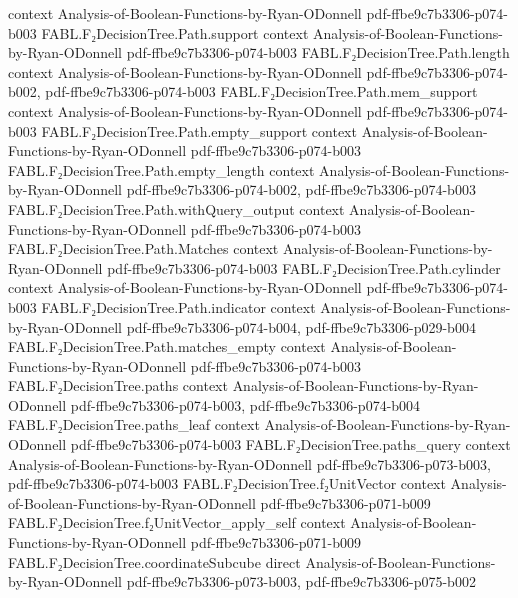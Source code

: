 \begin{theorem}
  {context}
  {Analysis-of-Boolean-Functions-by-Ryan-ODonnell}
  {pdf-ffbe9c7b3306-p074-b003}
\proofstep
  {FABL.F₂DecisionTree.Path.support}
  {context}
  {Analysis-of-Boolean-Functions-by-Ryan-ODonnell}
  {pdf-ffbe9c7b3306-p074-b003}
\proofstep
  {FABL.F₂DecisionTree.Path.length}
  {context}
  {Analysis-of-Boolean-Functions-by-Ryan-ODonnell}
  {pdf-ffbe9c7b3306-p074-b002,
    pdf-ffbe9c7b3306-p074-b003}
\proofstep
  {FABL.F₂DecisionTree.Path.mem_support}
  {context}
  {Analysis-of-Boolean-Functions-by-Ryan-ODonnell}
  {pdf-ffbe9c7b3306-p074-b003}
\proofstep
  {FABL.F₂DecisionTree.Path.empty_support}
  {context}
  {Analysis-of-Boolean-Functions-by-Ryan-ODonnell}
  {pdf-ffbe9c7b3306-p074-b003}
\proofstep
  {FABL.F₂DecisionTree.Path.empty_length}
  {context}
  {Analysis-of-Boolean-Functions-by-Ryan-ODonnell}
  {pdf-ffbe9c7b3306-p074-b002,
    pdf-ffbe9c7b3306-p074-b003}
\proofstep
  {FABL.F₂DecisionTree.Path.withQuery_output}
  {context}
  {Analysis-of-Boolean-Functions-by-Ryan-ODonnell}
  {pdf-ffbe9c7b3306-p074-b003}
\proofstep
  {FABL.F₂DecisionTree.Path.Matches}
  {context}
  {Analysis-of-Boolean-Functions-by-Ryan-ODonnell}
  {pdf-ffbe9c7b3306-p074-b003}
\proofstep
  {FABL.F₂DecisionTree.Path.cylinder}
  {context}
  {Analysis-of-Boolean-Functions-by-Ryan-ODonnell}
  {pdf-ffbe9c7b3306-p074-b003}
\proofstep
  {FABL.F₂DecisionTree.Path.indicator}
  {context}
  {Analysis-of-Boolean-Functions-by-Ryan-ODonnell}
  {pdf-ffbe9c7b3306-p074-b004,
    pdf-ffbe9c7b3306-p029-b004}
\proofstep
  {FABL.F₂DecisionTree.Path.matches_empty}
  {context}
  {Analysis-of-Boolean-Functions-by-Ryan-ODonnell}
  {pdf-ffbe9c7b3306-p074-b003}
\proofstep
  {FABL.F₂DecisionTree.paths}
  {context}
  {Analysis-of-Boolean-Functions-by-Ryan-ODonnell}
  {pdf-ffbe9c7b3306-p074-b003,
    pdf-ffbe9c7b3306-p074-b004}
\proofstep
  {FABL.F₂DecisionTree.paths_leaf}
  {context}
  {Analysis-of-Boolean-Functions-by-Ryan-ODonnell}
  {pdf-ffbe9c7b3306-p074-b003}
\proofstep
  {FABL.F₂DecisionTree.paths_query}
  {context}
  {Analysis-of-Boolean-Functions-by-Ryan-ODonnell}
  {pdf-ffbe9c7b3306-p073-b003,
    pdf-ffbe9c7b3306-p074-b003}
\proofstep
  {FABL.F₂DecisionTree.f₂UnitVector}
  {context}
  {Analysis-of-Boolean-Functions-by-Ryan-ODonnell}
  {pdf-ffbe9c7b3306-p071-b009}
\proofstep
  {FABL.F₂DecisionTree.f₂UnitVector_apply_self}
  {context}
  {Analysis-of-Boolean-Functions-by-Ryan-ODonnell}
  {pdf-ffbe9c7b3306-p071-b009}
\proofstep
  {FABL.F₂DecisionTree.coordinateSubcube}
  {direct}
  {Analysis-of-Boolean-Functions-by-Ryan-ODonnell}
  {pdf-ffbe9c7b3306-p073-b003,
    pdf-ffbe9c7b3306-p075-b002}
\proofstep

\end{theorem}

